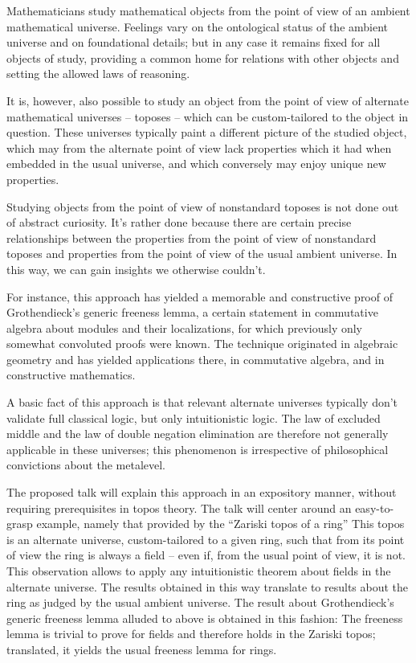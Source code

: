 \documentclass[a4paper,english,11pt]{scrartcl}
\begin{document}

Mathematicians study mathematical objects from the point of view of an ambient
mathematical universe. Feelings vary on the ontological status of the ambient
universe and on foundational details; but in any case it remains fixed for all
objects of study, providing a common home for relations with other objects and
setting the allowed laws of reasoning.

It is, however, also possible to study an object from the point of view of
alternate mathematical universes -- toposes -- which can be custom-tailored to
the object in question. These universes typically paint a different picture of
the studied object, which may from the alternate point of view lack properties
which it had when embedded in the usual universe, and which conversely may enjoy
unique new properties.

Studying objects from the point of view of nonstandard toposes is not done out
of abstract curiosity. It's rather done because there are certain precise
relationships between the properties from the point of view of nonstandard
toposes and properties from the point of view of the usual ambient universe.
In this way, we can gain insights we otherwise couldn't.

For instance, this approach has yielded a memorable and constructive proof of
Grothendieck's generic freeness lemma, a certain statement in commutative
algebra about modules and their localizations, for which previously only
somewhat convoluted proofs were known. The technique originated in algebraic
geometry and has yielded applications there, in commutative algebra, and in
constructive mathematics.

A basic fact of this approach is that relevant alternate universes typically
don't validate full classical logic, but only intuitionistic logic. The law of
excluded middle and the law of double negation elimination are therefore not
generally applicable in these universes; this phenomenon is irrespective of
philosophical convictions about the metalevel.

The proposed talk will explain this approach in an expository manner, without
requiring prerequisites in topos theory. The talk will center around an
easy-to-grasp example, namely that provided by the ``Zariski topos of a ring''
This topos is an alternate universe, custom-tailored to a given ring, such that
from its point of view the ring is always a field -- even if, from the usual
point of view, it is not. This observation allows to apply any intuitionistic
theorem about fields in the alternate universe. The results obtained in this
way translate to results about the ring as judged by the usual ambient
universe. The result about Grothendieck's generic freeness lemma alluded to
above is obtained in this fashion: The freeness lemma is trivial to prove
for fields and therefore holds in the Zariski topos; translated, it yields the
usual freeness lemma for rings.
\end{document}
